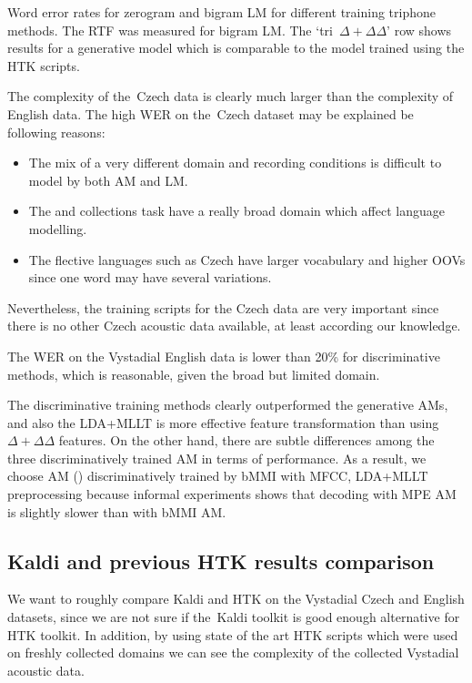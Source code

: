 \begin{table}[h]
\caption{Word error rates for zerogram and bigram LM for different training triphone methods.
    The RTF was measured for bigram \ac{LM}.
    The `tri~$\Delta+\Delta\Delta$' row shows results for a generative model which is comparable to the model trained using the HTK scripts.
}
\label{tab:best}
\end{table}

The complexity of the~Czech data is clearly much larger than the complexity of English data.
The high \ac{WER} on the~Czech dataset may be explained be following reasons:
\begin{itemize}
    \item The mix of a very different domain and recording conditions is difficult to model by both \ac{AM} and \ac{LM}. 
    \item The  and  collections task have a really broad domain which affect language modelling.
    \item The flective languages such as Czech have larger vocabulary and higher \acp{OOV} since one word may have several variations.
\end{itemize}
Nevertheless, the training scripts for the Czech data are very important since there is no other Czech acoustic data available, at least according our knowledge.

The \ac{WER} on the Vystadial English data is lower than 20\% for discriminative methods, which is reasonable, given the broad but limited domain.

The discriminative training methods clearly outperformed the generative \acp{AM}, and also the \ac{LDA}+\ac{MLLT} is more effective feature transformation than using $\Delta+\Delta\Delta$ features.
On the other hand, there are subtle differences among the three discriminatively trained \ac{AM} in terms of performance.
As a result, we choose \ac{AM} () discriminatively trained by \ac{bMMI} with \ac{MFCC}, \ac{LDA}+\ac{MLLT} preprocessing because informal experiments shows that decoding with \ac{MPE} \acl{AM} is slightly slower than with \ac{bMMI} \ac{AM}. 


\subsection[Kaldi and \acs{HTK} comparison]{Kaldi and previous \ac{HTK} results comparison} 
\label{sec:compare}

We want to roughly compare Kaldi and HTK on the Vystadial Czech and English datasets, since we are not sure if the~Kaldi toolkit is good enough alternative for \ac{HTK} toolkit.
In addition, by using state of the art \ac{HTK} scripts which were used on freshly collected domains we can see the complexity of the collected Vystadial acoustic data.

